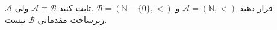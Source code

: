 قرار دهید
$\mathcal{A} = (\mathbb{N},<)$
و
$\mathcal{B} = (\mathbb{N}-\{0\},<)$
.ثابت کنید 
$\mathcal{A}\equiv\mathcal{B}$
ولی 
$\mathcal{A}$
زیرساخت مقدماتی 
$\mathcal{B}$
نیست.

